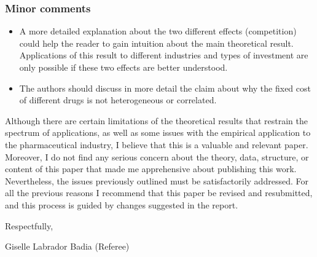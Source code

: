 \documentclass{article}
\theoremstyle{definition}
\begin{document}
\subsubsection*{Minor comments}
\begin{itemize}
    \item A more detailed explanation about the two different effects (competition) could help the reader to gain intuition about the main theoretical result. Applications of this result to different industries and types of investment are only possible if these two effects are better understood. 
    
    \item The authors should discuss in more detail the claim about why the fixed cost of different drugs is not heterogeneous or correlated. 
\end{itemize}

Although there are certain limitations of the theoretical results that restrain the spectrum of applications, as well as some issues with the empirical application to the pharmaceutical industry, I believe that this is a valuable and relevant paper. Moreover,  I do not find any serious concern about the theory, data, structure, or content of this paper that made me apprehensive about publishing this work. Nevertheless, the issues previously outlined must be satisfactorily addressed. For all the previous reasons I recommend that this paper be revised and resubmitted,  and this process is guided by changes suggested in the report. 

Respectfully,


Giselle Labrador Badia
(Referee)

\end{document}
